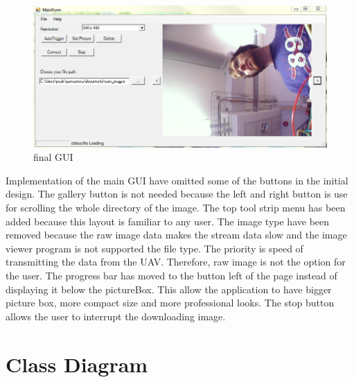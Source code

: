 \begin{figure}[!hbtp]
\begin{center}
\includegraphics[scale=0.5]{figures/finalGUI.png} 
\end{center}
\caption{final GUI\label{finalGUI}}
\end{figure}
Implementation of the main GUI have omitted some of the buttons in the initial design. 
The gallery button is not needed because the left and right button is use for scrolling the whole directory of the image. 
The top tool strip menu has been added because this layout is familiar to any user. 
The image type have been removed because the raw image data makes the stream data slow and the image viewer program is not supported the file type.
The priority is speed of transmitting the data from the UAV. 
Therefore, raw image is not the option for the user. 
The progress bar has moved to the button left of the page instead of displaying it below the pictureBox.
This allow the application to have bigger picture box, more compact size and more professional looks.
The stop button allows the user to interrupt the downloading image.
\section{Class Diagram}
